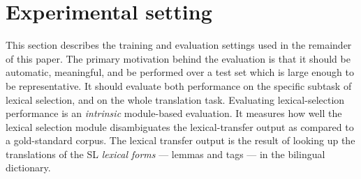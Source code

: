 \documentclass[11pt]{article}
\newcommand{\todomlf}[1]{\renewcommand{\baselinestretch}{0.55}\todo{\scriptsize\sf MLF: #1}\renewcommand{\baselinestretch}{1.0}}
\begin{document}
%   
\section{Experimental setting}

This section describes the training and evaluation settings used in
the remainder of this paper. The primary motivation behind the
evaluation is that it should be automatic, meaningful, and be performed over a test set which
is large enough to be representative. It should evaluate both
performance on the specific subtask of lexical selection, and on the
whole translation task. Evaluating lexical-selection performance is an
\emph{intrinsic} module-based evaluation.  It measures how well the lexical
selection module disambiguates the lexical-transfer
output as compared to a gold-standard corpus. The lexical 
transfer output is the result of looking up the translations of the 
SL \emph{lexical forms} --- lemmas and  %
tags --- in the bilingual dictionary.
\end{document}
